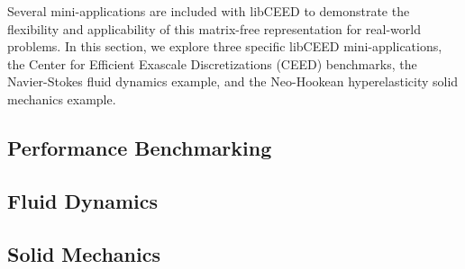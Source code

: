 Several mini-applications are included with libCEED \cite{libceed-user-manual} to demonstrate the flexibility and applicability of this matrix-free representation for real-world problems.
In this section, we explore three specific libCEED mini-applications, the Center for Efficient Exascale Discretizations (CEED) benchmarks, the Navier-Stokes fluid dynamics example, and the Neo-Hookean hyperelasticity solid mechanics example.

\subsection{Performance Benchmarking}\label{sec:app-bench}


\subsection{Fluid Dynamics}\label{sec:app-fluid}


\subsection{Solid Mechanics}\label{sec:app-solid}

